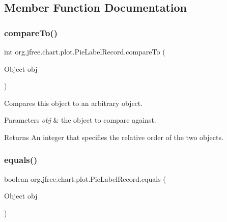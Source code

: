 \subsection{Member Function Documentation}
\mbox{\label{classorg_1_1jfree_1_1chart_1_1plot_1_1_pie_label_record_a523d8bb7557e1d4b2153404f34dace35}} 
\subsubsection{\texorpdfstring{compare\+To()}{compareTo()}}
{\footnotesize\ttfamily int org.\+jfree.\+chart.\+plot.\+Pie\+Label\+Record.\+compare\+To (\begin{DoxyParamCaption}\item[{Object}]{obj }\end{DoxyParamCaption})}

Compares this object to an arbitrary object.


\begin{DoxyParams}{Parameters}
{\em obj} & the object to compare against.\\
\hline
\end{DoxyParams}
\begin{DoxyReturn}{Returns}
An integer that specifies the relative order of the two objects. 
\end{DoxyReturn}
\mbox{\label{classorg_1_1jfree_1_1chart_1_1plot_1_1_pie_label_record_a7691803cfa8d9d6b79806c3abb2d1e7c}} 
\subsubsection{\texorpdfstring{equals()}{equals()}}
{\footnotesize\ttfamily boolean org.\+jfree.\+chart.\+plot.\+Pie\+Label\+Record.\+equals (\begin{DoxyParamCaption}\item[{Object}]{obj }\end{DoxyParamCaption})}

